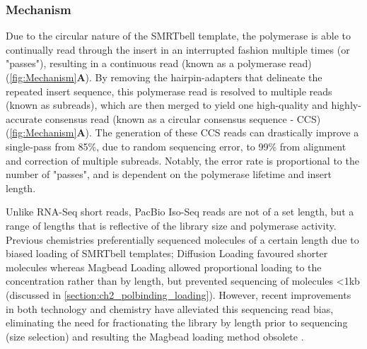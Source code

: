 \vspace{1cm}
\subsubsection{Mechanism}
Due to the circular nature of the SMRTbell template, the polymerase is able to continually read through the insert in an interrupted fashion multiple times (or "passes"), resulting in a continuous read (known as a polymerase read) (\cref{fig:Mechanism}\textbf{A}). By removing the hairpin-adapters that delineate the repeated insert sequence, this polymerase read is resolved to multiple reads (known as subreads), which are then merged to yield one high-quality and highly-accurate consensus read (known as a circular consensus sequence - CCS) (\cref{fig:Mechanism}\textbf{A}). The generation of these CCS reads can drastically improve a single-pass from 85\%, due to random sequencing error, to 99\% from alignment and correction of multiple subreads. Notably, the error rate is proportional to the number of "passes", and is dependent on the polymerase lifetime and insert length\cite{Travers2010}. 

Unlike RNA-Seq short reads, PacBio Iso-Seq reads are not of a set length, but a range of lengths that is reflective of the library size and polymerase activity\cite{Ardui2018,Rhoads2015}. Previous chemistries preferentially sequenced molecules of a certain length due to biased loading of SMRTbell templates; Diffusion Loading favoured shorter molecules\cite{Loomis2013} whereas Magbead Loading allowed proportional loading to the concentration rather than by length, but prevented sequencing of molecules <1kb (discussed in \cref{section:ch2_polbinding_loading}). However, recent improvements in both technology and chemistry have alleviated this sequencing read bias, eliminating the need for fractionating the library by length prior to sequencing (size selection) and resulting the Magbead loading method obsolete \cite{Oikonomopoulos2020}.

